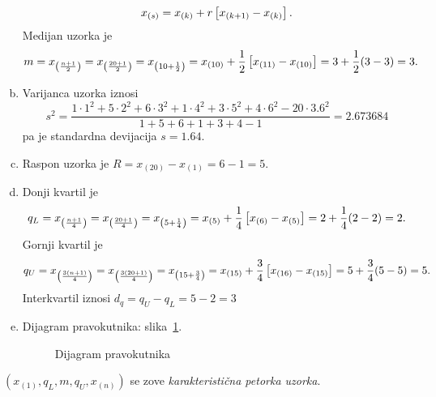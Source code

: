 \documentclass[12pt]{scrartcl}
\begin{document}
\begin{rjesenje}
\begin{enumerate}[(a)]
\begin{equation}
    x_{(s)}=x_{(k)}+r\left[x_{(k+1)}-x_{(k)}\right]\text.
\end{equation}
Medijan uzorka je
\begin{equation}
    m=x_{\left(\frac{n+1}{2}\right)}=x_{\left(\frac{20+1}{2}\right)}=x_{\left(10+\frac{1}{2}\right)}=x_{\left(10\right)}+\dfrac{1}{2}\left[x_{(11)}-x_{(10)}\right]=3+\dfrac{1}{2}(3-3)=3\text.
\end{equation}
\item Varijanca uzorka iznosi
\begin{equation}
    s^2=\dfrac{1\cdot1^2+5\cdot2^2+6\cdot3^2+1\cdot4^2+3\cdot5^2+4\cdot6^2-20\cdot3.6^2}{1+5+6+1+3+4-1}=2.673684
\end{equation}
pa je standardna devijacija $s=1.64$.
\item Raspon uzorka je $R=x_{(20)}-x_{(1)}=6-1=5$.
\item Donji kvartil je
\begin{equation}
    q_L=x_{\left(\frac{n+1}{4}\right)}=x_{\left(\frac{20+1}{4}\right)}=x_{\left(5+\frac{1}{4}\right)}=x_{(5)}+\dfrac{1}{4}\left[x_{(6)}-x_{(5)}\right]=2+\dfrac{1}{4}(2-2)=2\text.
\end{equation}
Gornji kvartil je
\begin{equation}
    q_U=x_{\left(\frac{3(n+1)}{4}\right)}=x_{\left(\frac{3(20+1)}{4}\right)}=x_{\left(15+\frac{3}{4}\right)}=x_{(15)}+\dfrac{3}{4}\left[x_{(16)}-x_{(15)}\right]=5+\dfrac{3}{4}(5-5)=5\text.
\end{equation}
Interkvartil iznosi $d_q=q_U-q_L=5-2=3$
\item Dijagram pravokutnika: slika~\ref{fig:boxplotprvi}.
\begin{figure}
    \centering
    \caption{Dijagram pravokutnika}
    \label{fig:boxplotprvi}
\end{figure}
\end{enumerate}
\end{rjesenje}
\begin{napomena}
$\left(x_{(1)},q_L,m,q_U,x_{(n)}\right)$ se zove \textsl{karakteristična petorka uzorka}.
\end{napomena}
\end{document}
